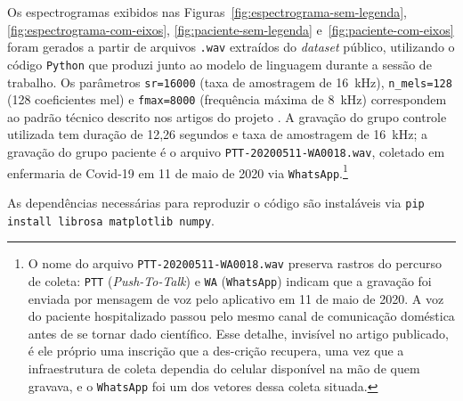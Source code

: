Os espectrogramas exibidos nas Figuras~\protect\ref{fig:espectrograma-sem-legenda}, \ref{fig:espectrograma-com-eixos}, \ref{fig:paciente-sem-legenda} e~\ref{fig:paciente-com-eixos} foram gerados a partir de arquivos \texttt{.wav} extraídos do \textit{dataset} público, utilizando o código \texttt{Python} que produzi junto ao modelo de linguagem durante a sessão de trabalho. Os parâmetros \texttt{sr=16000} (taxa de amostragem de 16~kHz), \texttt{n\_mels=128} (128 coeficientes mel) e \texttt{fmax=8000} (frequência máxima de 8~kHz) correspondem ao padrão técnico descrito nos artigos do projeto \parencite{Casanova2021DeepLearning,Gauy2024Discriminant}. A gravação do grupo controle utilizada tem duração de 12,26 segundos e taxa de amostragem de 16~kHz; a gravação do grupo paciente é o arquivo \texttt{PTT-20200511-WA0018.wav}, coletado em enfermaria de Covid-19 em 11 de maio de 2020 via \texttt{WhatsApp}.\footnote{O nome do arquivo \texttt{PTT-20200511-WA0018.wav} preserva rastros do percurso de coleta: \texttt{PTT} (\textit{Push-To-Talk}) e \texttt{WA} (\texttt{WhatsApp}) indicam que a gravação foi enviada por mensagem de voz pelo aplicativo em 11 de maio de 2020. A voz do paciente hospitalizado passou pelo mesmo canal de comunicação doméstica antes de se tornar dado científico. Esse detalhe, invisível no artigo publicado, é ele próprio uma inscrição que a des-crição \parencite{Akrich1992Description} recupera, uma vez que a infraestrutura de coleta dependia do celular disponível na mão de quem gravava, e o \texttt{WhatsApp} foi um dos vetores dessa coleta situada.}

As dependências necessárias para reproduzir o código são instaláveis via \texttt{pip install librosa matplotlib numpy}.

